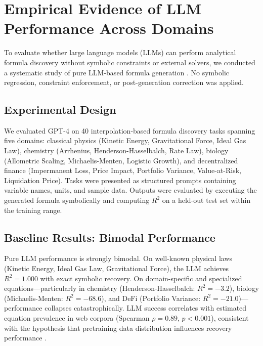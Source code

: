 \documentclass[twoside,11pt]{article}
\newcommand{\Rsq}{R^{2}}
\begin{document}
\section{Empirical Evidence of LLM Performance Across Domains}
\label{sec:llm_limitations}\label{sec:llm_domain}

To evaluate whether large language models (LLMs) can perform analytical formula discovery without symbolic constraints or external solvers, we conducted a systematic study of pure LLM-based formula generation \citep{koza1994genetic,kambhampati2024llms}. No symbolic regression, constraint enforcement, or post-generation correction was applied.

\subsection{Experimental Design}

We evaluated GPT-4 \citep{openai2023gpt4} on 40 interpolation-based formula discovery tasks spanning five domains: classical physics (Kinetic Energy, Gravitational Force, Ideal Gas Law), chemistry (Arrhenius, Henderson-Hasselbalch, Rate Law), biology (Allometric Scaling, Michaelis-Menten, Logistic Growth), and decentralized finance (Impermanent Loss, Price Impact, Portfolio Variance, Value-at-Risk, Liquidation Price). Tasks were presented as structured prompts containing variable names, units, and sample data. Outputs were evaluated by executing the generated formula symbolically and computing $\Rsq$ on a held-out test set within the training range.

\subsection{Baseline Results: Bimodal Performance}

Pure LLM performance is strongly bimodal. On well-known physical laws (Kinetic Energy, Ideal Gas Law, Gravitational Force), the LLM achieves $\Rsq = 1.000$ with exact symbolic recovery. On domain-specific and specialized equations---particularly in chemistry (Henderson-Hasselbalch: $\Rsq = -3.2$), biology (Michaelis-Menten: $\Rsq = -68.6$), and DeFi (Portfolio Variance: $\Rsq = -21.0$)---performance collapses catastrophically. LLM success correlates with estimated equation prevalence in web corpora (Spearman $\rho = 0.89$, $p < 0.001$), consistent with the hypothesis that pretraining data distribution influences recovery performance \citep{kambhampati2024llms}.
\end{document}
